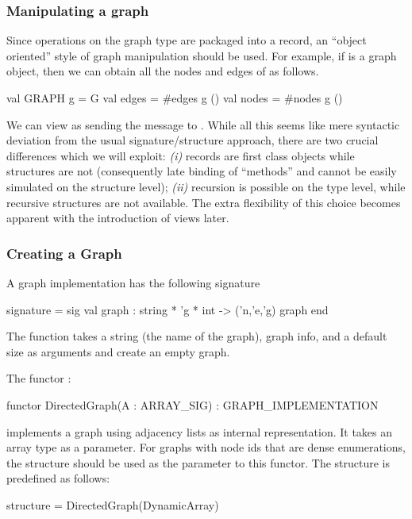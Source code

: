 \subsubsection{Manipulating a graph}
 
Since operations on the graph type are packaged into
a record, an ``object oriented'' style of graph manipulation should be used.
For example, if  is a graph object, then we can obtain all the
nodes and edges of  as follows.
\begin{SML}
 val GRAPH g = G
 val edges = #edges g ()
 val nodes = #nodes g ()
\end{SML}
We can view  as sending the message to .
While all this seems like mere syntactic deviation from the usual
 signature/structure approach, there are two crucial differences which
we will exploit:
\emph{(i)} records are first class objects 
while structures are not (consequently
late binding of ``methods'' and cannot be easily simulated on the
structure level); \emph{(ii)} recursion
is possible on the type level, while recursive structures are not available.
The extra flexibility of this choice becomes apparent with the
introduction of views later. 

\subsubsection{Creating a Graph}

A graph implementation has the following signature
\begin{SML}
 signature  = sig
   val graph : string * 'g * int -> ('n,'e,'g) graph
 end
\end{SML}
The function  takes a string (the name of the graph),
graph info, and a default size as arguments and create an empty graph.

The functor :
\begin{SML}
 functor DirectedGraph(A : ARRAY_SIG) : GRAPH_IMPLEMENTATION
\end{SML}
implements a graph using adjacency lists as internal representation.
It takes an array type as a parameter.  For graphs with
node ids that are dense enumerations, the  structure
should be used as the parameter to this functor. 
The structure  is predefined as follows:
\begin{SML}
 structure  = DirectedGraph(DynamicArray)
\end{SML}

